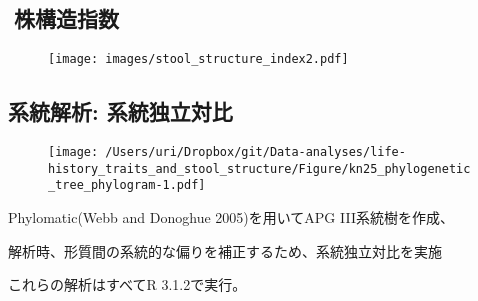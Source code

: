 \documentclass[a0, 30pt, plainboxedsections]{sciposter} %
\begin{document}
\begin{multicols}{3}
{\subsection*{\small{株構造指数}}

\begin{figure}
  \flushleft
   \texttt{[image: images/stool\_structure\_index2.pdf]}
\end{figure}

\columnbreak
\subsection*{\small{系統解析: 系統独立対比}}

\begin{wrapfigure}{r}{16em}
  \texttt{[image: /Users/uri/Dropbox/git/Data-analyses/life-history\_traits\_and\_stool\_structure/Figure/kn25\_phylogenetic\_tree\_phylogram-1.pdf]}
\end{wrapfigure}

Phylomatic(Webb and Donoghue 2005)を用いてAPG III系統樹を作成、

解析時、形質間の系統的な偏りを補正するため、系統独立対比を実施

これらの解析はすべてR 3.1.2で実行。

}\end{multicols}
\begin{mdframed}[style=section.frame]
  \centering\huge\textbf{\color{white}{結果}}
\end{mdframed}
\end{document}
